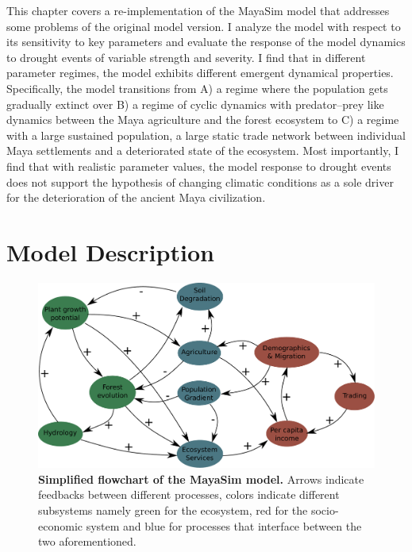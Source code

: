 This chapter covers a re-implementation of the MayaSim model that addresses some problems of the original model version. I analyze the model with respect to its sensitivity to key parameters and evaluate the response of the model dynamics to drought events of variable strength and severity. I find that in different parameter regimes, the model exhibits different emergent dynamical properties. Specifically, the model transitions from A) a regime where the population gets gradually extinct over B) a regime of cyclic dynamics with predator--prey like dynamics between the Maya agriculture and the forest ecosystem to C) a regime with a large sustained population, a large static trade network between individual Maya settlements and a deteriorated state of the ecosystem. Most importantly, I find that with realistic parameter values, the model response to drought events does not support the hypothesis of changing climatic conditions as a sole driver for the deterioration of the ancient Maya civilization.

\section{Model Description}


\begin{figure}
    \centering
    \includegraphics[width=.9 \textwidth]{figures/model_flowchart.pdf}
    \caption{\textbf{Simplified flowchart of the MayaSim model.} Arrows indicate feedbacks between different processes, colors indicate different subsystems namely green for the ecosystem, red for the socio-economic system and blue for processes that interface between the two aforementioned.}
    \label{fig:my_label}
\end{figure}

